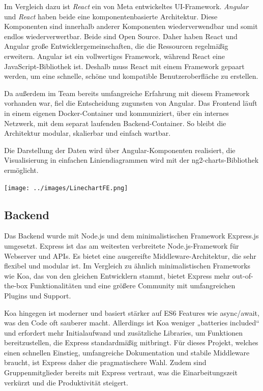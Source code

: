 Im Vergleich dazu ist \textit{React} ein von Meta entwickeltes UI-Framework. 
\textit{Angular} und \textit{React} haben beide eine komponentenbasierte Architektur. 
Diese Komponenten sind innerhalb anderer Komponenten wiederverwendbar und somit endlos wiederverwertbar. 
Beide sind Open Source. Daher haben React und Angular große Entwicklergemeinschaften, die die Ressourcen regelmäßig erweitern.
Angular ist ein vollwertiges Framework, während React eine JavaScript-Bibliothek ist. 
Deshalb muss React mit einem Framework gepaart werden, um eine schnelle, schöne und kompatible Benutzeroberfläche zu erstellen. 
\cite{kinsta2023angularvreact}

Da außerdem im Team bereits umfangreiche Erfahrung mit diesem Framework vorhanden war, fiel die Entscheidung zugunsten von Angular.
Das Frontend läuft in einem eigenen Docker-Container und kommuniziert, über ein internes Netzwerk, mit dem separat laufenden Backend-Container. 
So bleibt die Architektur modular, skalierbar und einfach wartbar.

Die Darstellung der Daten wird über Angular-Komponenten realisiert,
die Visualisierung in einfachen Liniendiagrammen wird mit der ng2-charts-Bibliothek ermöglicht.
\begin{center}
  \texttt{[image: ../images/LinechartFE.png]}
\end{center}

\subsection{Backend}
Das Backend wurde mit Node.js und dem minimalistischen Framework Express.js umgesetzt. 
Express ist das am weitesten verbreitete Node.js-Framework für Webserver und APIs. 
Es bietet eine ausgereifte Middleware-Architektur, die sehr flexibel und modular ist. 
Im Vergleich zu ähnlich minimalistischen Frameworks wie Koa, 
das von den gleichen Entwicklern stammt, 
bietet Express mehr out-of-the-box Funktionalitäten und eine größere Community mit umfangreichen Plugins und Support. \cite{betterstack2025koavsexpress,appventurez2025nodejsframework}

Koa hingegen ist moderner und basiert stärker auf ES6 Features wie async/await, was den Code oft sauberer macht. 
Allerdings ist Koa weniger „batteries included“ und erfordert mehr Initialaufwand und zusätzliche Libraries, 
um Funktionen bereitzustellen, die Express standardmäßig mitbringt. 
Für dieses Projekt, welches einen schnellen Einstieg, umfangreiche Dokumentation und stabile Middleware braucht, 
ist Express daher die pragmatischere Wahl.
Zudem sind Gruppenmitglieder bereits mit Express vertraut, was die Einarbeitungszeit verkürzt und die Produktivität steigert. 

